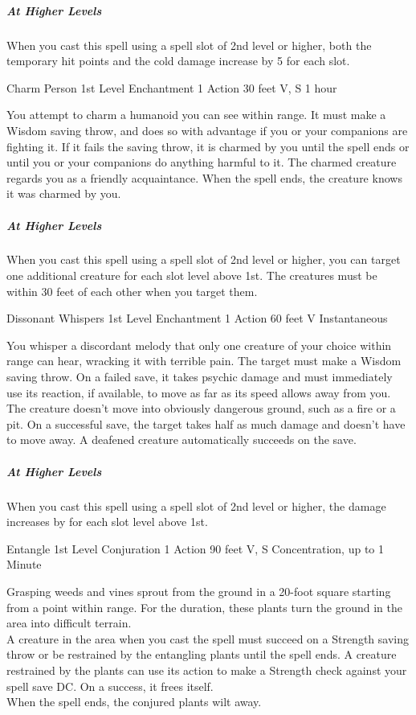 \documentclass[letterpaper,openany,oneside,twocolumn]{book}
\begin{document}
\subparagraph*{At Higher Levels} When you cast this spell using a spell slot of 2nd level or higher, both the temporary hit points and the cold damage increase by 5 for each slot.

\DndSpellHeader
  {Charm Person}
  {1st Level Enchantment}
  {1 Action}
  {30 feet}
  {V, S}
  {1 hour}

You attempt to charm a humanoid you can see within range. It must make a Wisdom saving throw, and does so with advantage if you or your companions are fighting it. If it fails the saving throw, it is charmed by you until the spell ends or until you or your companions do anything harmful to it. The charmed creature regards you as a friendly acquaintance. When the spell ends, the creature knows it was charmed by you.

\subparagraph*{At Higher Levels} When you cast this spell using a spell slot of 2nd level or higher, you can target one additional creature for each slot level above 1st. The creatures must be within 30 feet of each other when you target them.

\DndSpellHeader
  {Dissonant Whispers}
  {1st Level Enchantment}
  {1 Action}
  {60 feet}
  {V}
  {Instantaneous}

You whisper a discordant melody that only one creature of your choice within range can hear, wracking it with terrible pain. The target must make a Wisdom saving throw. On a failed save, it takes  psychic damage and must immediately use its reaction, if available, to move as far as its speed allows away from you. The creature doesn't move into obviously dangerous ground, such as a fire or a pit. On a successful save, the target takes half as much damage and doesn't have to move away. A deafened creature automatically succeeds on the save.

\subparagraph*{At Higher Levels} When you cast this spell using a spell slot of 2nd level or higher, the damage increases by  for each slot level above 1st.

\DndSpellHeader
  {Entangle}
  {1st Level Conjuration}
  {1 Action}
  {90 feet}
  {V, S}
  {Concentration, up to 1 Minute}
  
Grasping weeds and vines sprout from the ground in a 20-foot square starting from a point within range. For the duration, these plants turn the ground in the area into difficult terrain.\\
A creature in the area when you cast the spell must succeed on a Strength saving throw or be restrained by the entangling plants until the spell ends. A creature restrained by the plants can use its action to make a Strength check against your spell save DC. On a success, it frees itself.\\
When the spell ends, the conjured plants wilt away.
\end{document}
